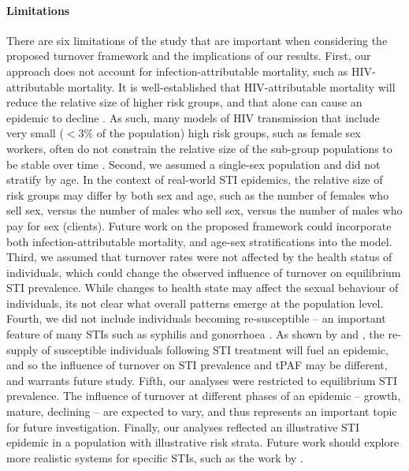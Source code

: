 \paragraph{Limitations}
There are six limitations of the study that are important when considering
the proposed turnover framework and the implications of our results.
First, our approach does not account for
infection-attributable mortality, such as HIV-attributable mortality.
It is well-established that HIV-attributable mortality will reduce the 
relative size of higher risk groups,
and that alone can cause an epidemic to decline \citep{Boily1997}.
As such, many models of HIV transmission
that include very small ($<3\%$ of the population)
high risk groups, such as female sex workers,
often do not constrain the relative size
of the sub-group populations to be stable over time
\citep{Pickles2013}.
Second, we assumed a single-sex population and did not stratify by age.
In the context of real-world STI epidemics,
the relative size of risk groups may differ
by both sex and age,
such as the number of females who sell sex,
versus the number of males who sell sex,
versus the number of males who pay for sex (clients).
Future work on the proposed framework could incorporate both
infection-attributable mortality, and age-sex stratifications into the model.
Third, we assumed that turnover rates were not affected by
the health status of individuals,
which could change the observed influence of turnover on
equilibrium STI prevalence.
While changes to health state may affect the sexual behaviour of individuals,
its not clear what overall patterns emerge at the population level.
Fourth, we did not include individuals becoming re-susceptible
-- an important feature of many STIs such as syphilis and gonorrhoea
\citep{Fenton2008}.
As shown by \citet{Fenton2008} and \citet{Pourbohloul2003},
the re-supply of susceptible individuals following STI treatment
will fuel an epidemic, and so the influence of turnover on
STI prevalence and tPAF may be different, and warrants future study.
Fifth, our analyses were restricted to equilibrium STI prevalence.
The influence of turnover at different phases of an epidemic
-- growth, mature, declining --
are expected to vary, and thus represents an important topic for future investigation.
Finally, our analyses reflected an illustrative STI epidemic
in a population with illustrative risk strata.
Future work should explore more realistic systems for specific STIs,
such as the work by \citet{Johnson2016}.


